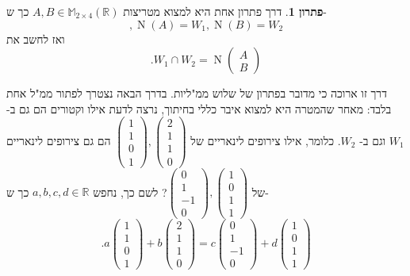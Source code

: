 \documentclass[12pt]{report}
\theoremstyle{plain}
\theoremstyle{definition}
\newtheorem*{solution}{פתרון}
\newcommand{\R}{\mathbb{R}}
\newcommand{\M}{\mathbb{M}}
\newcommand{\0}{\mathbf{0}}
\DeclareMathOperator{\Null}{N}
\begin{document}
\begin{solution}
דרך פתרון אחת היא למצוא מטריצות 
$A,B\in\M_{2\times 4}(\R)$
כך ש-
$$
,\Null(A)=W_1,\Null(B)=W_2
$$
ואז לחשב את
$$
.W_1\cap W_2=\Null\begin{pmatrix}
A \\
B
\end{pmatrix}
$$

דרך זו ארוכה כי מדובר בפתרון של שלוש ממ"ליות. בדרך הבאה נצטרך לפתור ממ"ל אחת בלבד: מאחר שהמטרה היא למצוא איבר כללי בחיתוך, נרצה לדעת אילו וקטורים הם גם ב-
$W_1$
וגם ב-
$W_2$.
כלומר, אילו צירופים לינאריים של
$\begin{pmatrix}1\\1\\0\\1\end{pmatrix},\begin{pmatrix}2\\1\\1\\0\end{pmatrix}$
הם גם צירופים לינאריים של
$\begin{pmatrix}0\\1\\-1\\0\end{pmatrix},\begin{pmatrix}1\\0\\1\\1\end{pmatrix}$?
לשם כך, נחפש
$a,b,c,d\in\R$
כך ש-
\begin{equation}\label{eqn:intersection}
.a\begin{pmatrix}1\\1\\0\\1\end{pmatrix}+b\begin{pmatrix}2\\1\\1\\0\end{pmatrix}=c\begin{pmatrix}0\\1\\-1\\0\end{pmatrix}+d\begin{pmatrix}1\\0\\1\\1\end{pmatrix}
\end{equation}


\end{solution}
\end{document}
